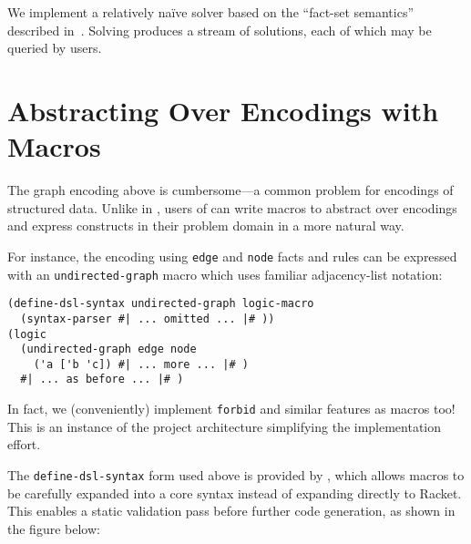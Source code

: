 \documentclass[dvipsnames,sigplan,screen,review,anonymous,acmthm,nonacm]{acmart}
\begin{document}
We implement a relatively naïve solver based on the ``fact-set semantics''
described in~\cite{martens2025dusa}. Solving produces a stream of solutions,
each of which may be queried by users.

\section{Abstracting Over Encodings with Macros}

The graph encoding above is cumbersome---a common problem
for encodings of structured data. Unlike in \Dusa{}, users of 
\miniDusa{} can write macros to abstract over encodings and express
constructs in their problem domain in a more natural way.

For instance, the encoding using \texttt{edge} and \texttt{node}
facts and rules can be expressed with an \texttt{undirected-graph}
macro which uses familiar adjacency-list notation:

\begin{verbatim}
(define-dsl-syntax undirected-graph logic-macro
  (syntax-parser #| ... omitted ... |# ))
(logic
  (undirected-graph edge node
    ('a ['b 'c]) #| ... more ... |# )
  #| ... as before ... |# )
\end{verbatim}

In fact, we (conveniently) implement \texttt{forbid} and similar features
as macros too!
This is an instance of the project architecture simplifying the implementation effort.

The \texttt{define-dsl-syntax} form used above is provided by \syntaxspec{},
which allows \miniDusa{} macros to be carefully expanded into a core syntax
instead of expanding directly to Racket.
This enables a static validation pass before further code generation,
as shown in the figure below:
\end{document}
